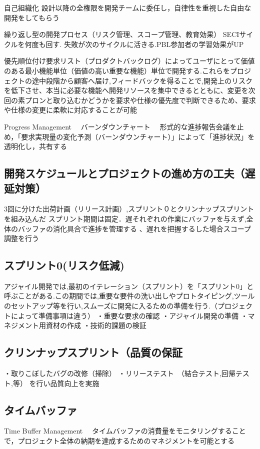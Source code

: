 \documentclass[paper]{jrsj}
\begin{document}
自己組織化
設計以降の全権限を開発チームに委任し，自律性を重視した自由な開発をしてもらう

繰り返し型の開発プロセス（リスク管理、スコープ管理、教育効果）
SECIサイクルを何度も回す.
失敗が次のサイクルに活きる.PBL参加者の学習効果がUP

優先順位付け要求リスト（プロダクトバックログ）によってユーザにとって価値のある最小機能単位（価値の高い重要な機能）単位で開発する.これらをプロジェクトの途中段階から顧客へ届け,フィードバックを得ることで,開発上のリスクを低下させ、本当に必要な機能へ開発リソースを集中できるとともに、変更を次回の素プロンと取り込むかどうかを要求や仕様の優先度で判断できるため、要求や仕様の変更に柔軟に対応することが可能

Progress Management 　バーンダウンチャート
　形式的な進捗報告会議を止め，「要求実現量の変化予測（バーンダウンチャート）」によって「進捗状況」を透明化し，共有する　

\subsection{開発スケジュールとプロジェクトの進め方の工夫（遅延対策）}
3回に分けた出荷計画（リリース計画）,スプリント０とクリンナップスプリントを組み込んだ
スプリント期間は固定．遅それぞれの作業にバッファを与えず,全体のバッファの消化具合で進捗を管理する
、遅れを把握するした場合スコープ調整を行う

\subsection{スプリント0(リスク低減)}
アジャイル開発では,最初のイテレーション（スプリント）を「スプリント0」と呼ぶことがある.この期間では,重要な要件の洗い出しやプロトタイピング,ツールのセットアップ等を行い,スムーズに開発に入るための準備を行う.（プロジェクトによって準備事項は違う）
・重要な要求の確認
・アジャイル開発の準備
・マネジメント用資材の作成
・技術的課題の検証

\subsection{クリンナップスプリント（品質の保証}
・取りこぼしたバグの改修（掃除）
・リリーステスト　（結合テスト,回帰テスト,等）
を行い品質向上を実施

\subsection{タイムバッファ}
Time Buffer Management
　タイムバッファの消費量をモニタリングすることで，プロジェクト全体の納期を達成するためのマネジメントを可能とする
\end{document}
